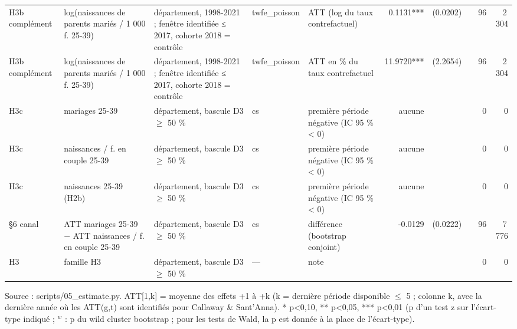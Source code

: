 \begin{table}
\begin{threeparttable}
\begin{tabular}{lp{3.8cm}p{5.5cm}lp{3.5cm}rrrrr}
H3b complément & log(naissances de parents mariés / 1 000 f. 25-39) & département, 1998-2021 ; fenêtre identifiée ≤ 2017, cohorte 2018 = contrôle & twfe\_poisson & ATT (log du taux contrefactuel) & 0.1131*** & (0.0202) &  & 96 & 2\,304 \\
H3b complément & log(naissances de parents mariés / 1 000 f. 25-39) & département, 1998-2021 ; fenêtre identifiée ≤ 2017, cohorte 2018 = contrôle & twfe\_poisson & ATT en \% du taux contrefactuel & 11.9720*** & (2.2654) &  & 96 & 2\,304 \\
H3c & mariages 25-39 & département, bascule D3 $\geq$ 50 \% & cs & première période négative (IC 95 \% < 0) & aucune &  &  & 0 & 0 \\
H3c & naissances / f. en couple 25-39 & département, bascule D3 $\geq$ 50 \% & cs & première période négative (IC 95 \% < 0) & aucune &  &  & 0 & 0 \\
H3c & naissances 25-39 (H2b) & département, bascule D3 $\geq$ 50 \% & cs & première période négative (IC 95 \% < 0) & aucune &  &  & 0 & 0 \\
§6 canal & ATT mariages 25-39 $-$ ATT naissances / f. en couple 25-39 & département, bascule D3 $\geq$ 50 \% & cs & différence (bootstrap conjoint) & -0.0129 & (0.0222) &  & 96 & 7\,776 \\
H3 & famille H3 & département, bascule D3 $\geq$ 50 \% & — & note &  &  &  & 0 & 0 \\
\bottomrule
\end{tabular}
\begin{tablenotes}\footnotesize
\item Source : scripts/05\_estimate.py. ATT[1,k] = moyenne des effets +1 à +k (k = dernière période disponible $\leq$ 5 ; colonne k, avec la dernière année où les ATT(g,t) sont identifiés pour Callaway \& Sant'Anna). * p<0,10, ** p<0,05, *** p<0,01 (p d'un test z sur l'écart-type indiqué ; $^{w}$ : p du wild cluster bootstrap ; pour les tests de Wald, la p est donnée à la place de l'écart-type).
\end{tablenotes}
\end{threeparttable}
\end{table}
